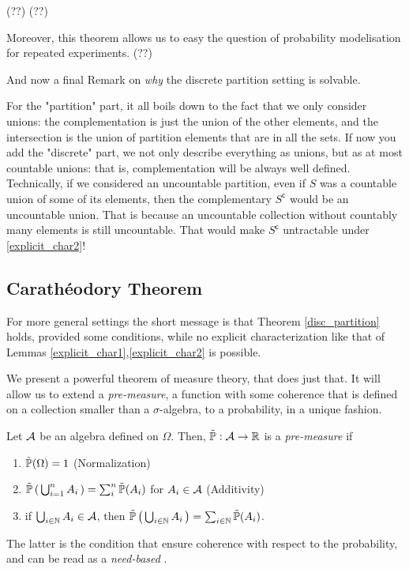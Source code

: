 \begin{my_example}
	(??) %
	(??) %
\end{my_example}
Moreover, this theorem allows us to easy the question of probability modelisation for repeated experiments. 
(??) %

And now a final Remark on \textit{why} the discrete partition setting is solvable. 
\begin{my_remark}
	For the "partition" part, it all boils down to the fact that we only consider unions: the complementation is just the union of the other elements, and the intersection is the union of partition elements that are in all the sets. 
	If now you add the "discrete" part, we not only describe everything as unions, but as at most countable unions: that is, complementation will be always well defined. 
	Technically, if we considered an uncountable partition, even if $S$ was a countable union of some of its elements, then the complementary $S^\mathsf{c}$ would be an uncountable union. That is because an uncountable collection without countably many elements is still uncountable. That would make $S^\mathsf{c}$ untractable under \ref{explicit_char2}!
\end{my_remark}

\subsection{Carathéodory Theorem}

For more general settings the short message is that Theorem \ref{disc_partition} holds, provided some conditions, while no explicit characterization like that of Lemmas \ref{explicit_char1},\ref{explicit_char2} is possible.

We present a powerful theorem of measure theory, that does just that. It will allow us to extend a \textit{pre-measure}, a function with some coherence that is defined on a collection smaller than a $\sigma$-algebra, to a probability, in a unique fashion.

\goodbreak\begin{my_definition}
	\label{proprob}
	Let $\mathcal{A}$ be an algebra defined on $\Omega$. Then, $\tilde{\mathbb{P}}:\mathcal{A}\to\mathbb{R}$ is a \textit{pre-measure} if
	\begin{enumerate}
		\item $\tilde{\mathbb{P}}( \Omega ) = 1$ \hfill (Normalization)
		\item $\tilde{\mathbb{P}} \left( \, \bigcup^n_{i=1} A_i \, \right) = \sum^n_i \tilde{\mathbb{P}}(A_i)$ for $A_i\in\mathcal{A}$ \hfill (Additivity)
		\item if $\bigcup_{ i \in \mathbb{N} } A_i \in \mathcal{A}$, then $\tilde{\mathbb{P}} \left( \,\bigcup_{ i \in \mathbb{N} } A_i \,\right) = \sum_{ i \in \mathbb{N}} \tilde{\mathbb{P}}(A_i)$.
	\end{enumerate}
\end{my_definition}
\begin{my_remark}
	The latter is the condition that ensure coherence with respect to the probability, and can be read as a \textit{need-based \sigmaadd}.
\end{my_remark}

